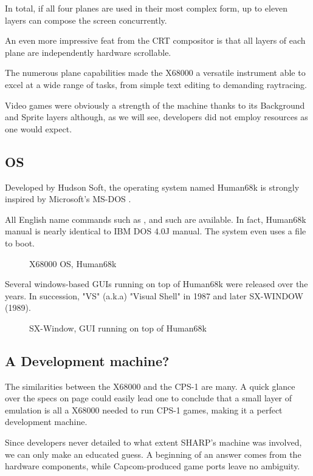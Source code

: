 In total, if all four planes are used in their most complex form, up to eleven layers can compose the screen concurrently. 

An even more impressive feat from the CRT compositor is that all layers of each plane are independently hardware scrollable.

The numerous plane capabilities made the X68000 a versatile instrument able to excel at a wide range of tasks, from simple text editing to demanding raytracing. 

Video games were obviously a strength of the machine thanks to its Background and Sprite layers although, as we will see, developers did not employ resources as one would expect.



\subsection{OS}
Developed by Hudson Soft, the operating system named Human68k is strongly inspired by Microsoft's MS-DOS . 

All English name commands such as ,  and such are available. In fact, Human68k manual is nearly identical to IBM DOS 4.0J manual\cite{human68k_manual}. The system even uses a  file to boot.

\begin{figure}[H]
\caption*{X68000 OS, Human68k}
\end{figure}


Several windows-based GUIs running on top of Human68k were released over the years. In succession, "VS" (a.k.a) "Visual Shell" in 1987 and later SX-WINDOW (1989).

\begin{figure}[H]
\caption*{SX-Window, GUI running on top of Human68k}
\end{figure}



\subsection{A Development machine?}
The similarities between the X68000 and the CPS-1 are many. A quick glance over the specs on page \pageref{x68000-specs} could easily lead one to conclude that a small layer of emulation is all a X68000 needed to run CPS-1 games, making it a perfect development machine. 

Since developers never detailed to what extent SHARP's machine was involved, we can only make an educated guess. A beginning of an answer comes from the hardware components, while Capcom-produced game ports leave no ambiguity.

